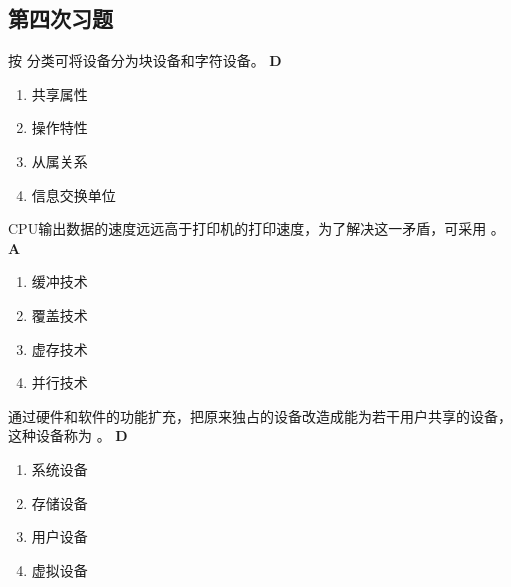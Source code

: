 \subsection*{第四次习题}
\setcounter{problemname}{0}

\begin{problem}
	按 \myline 分类可将设备分为块设备和字符设备。
	\textbf{D}
	\vspace{-0.5em}
	\begin{multicols}{4}
		\begin{enumerate}[label=\Alph*.]
			\item 共享属性
			\item 操作特性
			\item 从属关系
			\item 信息交换单位
		\end{enumerate}
	\end{multicols}
	\vspace{-1em}
\end{problem}


\begin{problem}
	CPU输出数据的速度远远高于打印机的打印速度，为了解决这一矛盾，可采用 \myline。
	\textbf{A}
	\vspace{-0.5em}
	\begin{multicols}{4}
		\begin{enumerate}[label=\Alph*.]
			\item 缓冲技术
			\item 覆盖技术
			\item 虚存技术
			\item 并行技术
		\end{enumerate}
	\end{multicols}
	\vspace{-1em}
\end{problem}


\begin{problem}
	通过硬件和软件的功能扩充，把原来独占的设备改造成能为若干用户共享的设备，这种设备称为 \myline。
	\textbf{D}
	\vspace{-0.5em}
	\begin{multicols}{4}
		\begin{enumerate}[label=\Alph*.]
			\item 系统设备
			\item 存储设备
			\item 用户设备
			\item 虚拟设备
		\end{enumerate}
	\end{multicols}
	\vspace{-1em}
\end{problem}


